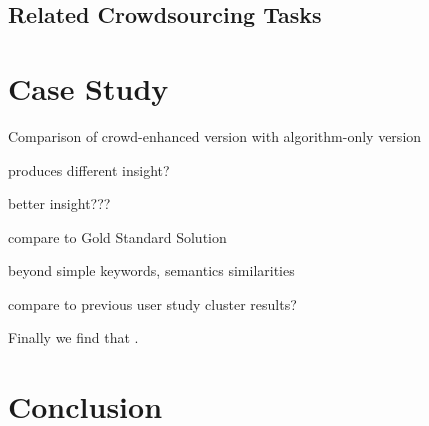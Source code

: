 \documentclass[journal]{vgtc}                %
\begin{document}
\subsection{Related Crowdsourcing Tasks}


\section{Case Study}

Comparison of crowd-enhanced version with algorithm-only version


produces different insight?

better insight???


compare to Gold Standard Solution


beyond simple keywords, semantics similarities


compare to previous user study cluster results?

Finally we find that .

\section{Conclusion}


%

%
%
%


\end{document}
